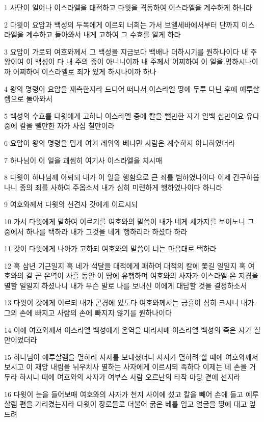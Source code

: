 \par 1 사단이 일어나 이스라엘을 대적하고 다윗을 격동하여 이스라엘을 계수하게 하니라
\par 2 다윗이 요압과 백성의 두목에게 이르되 너희는 가서 브엘세바에서부터 단까지 이스라엘을 계수하고 돌아와서 내게 고하여 그 수효를 알게 하라
\par 3 요압이 가로되 여호와께서 그 백성을 지금보다 백배나 더하시기를 원하나이다 내 주 왕이여 이 백성이 다 내 주의 종이 아니니이까 내 주께서 어찌하여 이 일을 명하시나이까 어찌하여 이스라엘로 죄가 있게 하시나이까 하나
\par 4 왕의 명령이 요압을 재촉한지라 드디어 떠나서 이스라엘 땅에 두루 다닌 후에 예루살렘으로 돌아와서
\par 5 백성의 수효를 다윗에게 고하니 이스라엘 중에 칼을 뺄만한 자가 일백 십만이요 유다 중에 칼을 뺄만한 자가 사십 칠만이라
\par 6 요압이 왕의 명령을 밉게 여겨 레위와 베냐민 사람은 계수하지 아니하였더라
\par 7 하나님이 이 일을 괘씸히 여기사 이스라엘을 치시매
\par 8 다윗이 하나님께 아뢰되 내가 이 일을 행함으로 큰 죄를 범하였나이다 이제 간구하옵나니 종의 죄를 사하여 주옵소서 내가 심히 미련하게 행하였나이다 하니라
\par 9 여호와께서 다윗의 선견자 갓에게 이르시되
\par 10 가서 다윗에게 말하여 이르기를 여호와의 말씀이 내가 네게 세가지를 보이노니 그 중에서 하나를 택하라 내가 그것을 네게 행하리라 하셨다 하라
\par 11 갓이 다윗에게 나아가 고하되 여호와의 말씀이 너는 마음대로 택하라
\par 12 혹 삼년 기근일지 혹 네가 석달을 대적에게 패하여 대적의 칼에 쫓길 일일지 혹 여호와의 칼 곧 온역이 사흘 동안 이 땅에 유행하며 여호와의 사자가 이스라엘 온 지경을 멸할 일일지 하셨나니 내가 무슨 말로 나를 보내신 이에게 대답할 것을 결정하소서
\par 13 다윗이 갓에게 이르되 내가 곤경에 있도다 여호와께서는 긍휼이 심히 크시니 내가 그의 손에 빠지고 사람의 손에 빠지지 않기를 원하나이다
\par 14 이에 여호와께서 이스라엘 백성에게 온역을 내리시매 이스라엘 백성의 죽은 자가 칠만이었더라
\par 15 하나님이 예루살렘을 멸하러 사자를 보내셨더니 사자가 멸하려 할 때에 여호와께서 보시고 이 재앙 내림을 뉘우치사 멸하는 사자에게 이르시되 족하다 이제는 네 손을 거두라 하시니 때에 여호와의 사자가 여부스 사람 오르난의 타작 마당 곁에 선지라
\par 16 다윗이 눈을 들어보매 여호와의 사자가 천지 사이에 섰고 칼을 빼어 손에 들고 예루살렘 편을 가리켰는지라 다윗이 장로들로 더불어 굵은 베를 입고 얼굴을 땅에 대고 엎드려
